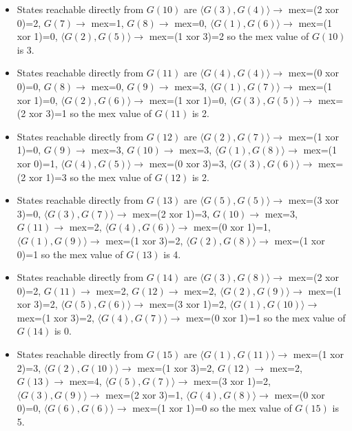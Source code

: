 \begin{solution}
\begin{itemize}
\item States reachable directly from $G(10)$ are $\langle G(3), G(4) \rangle \rightarrow$ mex=(2 xor 0)=2, $G(7) \rightarrow$ mex=1, $G(8) \rightarrow$ mex=0, $\langle G(1), G(6) \rangle \rightarrow$ mex=(1 xor 1)=0, $\langle G(2), G(5) \rangle \rightarrow$ mex=(1 xor 3)=2  so the mex value of $G(10)$ is 3.
\item States reachable directly from $G(11)$ are $\langle G(4), G(4) \rangle \rightarrow$ mex=(0 xor 0)=0, $G(8) \rightarrow$ mex=0, $G(9) \rightarrow$ mex=3, $\langle G(1), G(7) \rangle \rightarrow$ mex=(1 xor 1)=0, $\langle G(2), G(6) \rangle \rightarrow$ mex=(1 xor 1)=0, $\langle G(3), G(5) \rangle \rightarrow$ mex=(2 xor 3)=1  so the mex value of $G(11)$ is 2.
\item States reachable directly from $G(12)$ are $\langle G(2), G(7) \rangle \rightarrow$ mex=(1 xor 1)=0, $G(9) \rightarrow$ mex=3, $G(10) \rightarrow$ mex=3, $\langle G(1), G(8) \rangle \rightarrow$ mex=(1 xor 0)=1, $\langle G(4), G(5) \rangle \rightarrow$ mex=(0 xor 3)=3, $\langle G(3), G(6) \rangle \rightarrow$ mex=(2 xor 1)=3  so the mex value of $G(12)$ is 2.
\item States reachable directly from $G(13)$ are $\langle G(5), G(5) \rangle \rightarrow$ mex=(3 xor 3)=0, $\langle G(3), G(7) \rangle \rightarrow$ mex=(2 xor 1)=3, $G(10) \rightarrow$ mex=3, $G(11) \rightarrow$ mex=2, $\langle G(4), G(6) \rangle \rightarrow$ mex=(0 xor 1)=1, $\langle G(1), G(9) \rangle \rightarrow$ mex=(1 xor 3)=2, $\langle G(2), G(8) \rangle \rightarrow$ mex=(1 xor 0)=1  so the mex value of $G(13)$ is 4.
\item States reachable directly from $G(14)$ are $\langle G(3), G(8) \rangle \rightarrow$ mex=(2 xor 0)=2, $G(11) \rightarrow$ mex=2, $G(12) \rightarrow$ mex=2, $\langle G(2), G(9) \rangle \rightarrow$ mex=(1 xor 3)=2, $\langle G(5), G(6) \rangle \rightarrow$ mex=(3 xor 1)=2, $\langle G(1), G(10) \rangle \rightarrow$ mex=(1 xor 3)=2, $\langle G(4), G(7) \rangle \rightarrow$ mex=(0 xor 1)=1  so the mex value of $G(14)$ is 0.
\item States reachable directly from $G(15)$ are $\langle G(1), G(11) \rangle \rightarrow$ mex=(1 xor 2)=3, $\langle G(2), G(10) \rangle \rightarrow$ mex=(1 xor 3)=2, $G(12) \rightarrow$ mex=2, $G(13) \rightarrow$ mex=4, $\langle G(5), G(7) \rangle \rightarrow$ mex=(3 xor 1)=2, $\langle G(3), G(9) \rangle \rightarrow$ mex=(2 xor 3)=1, $\langle G(4), G(8) \rangle \rightarrow$ mex=(0 xor 0)=0, $\langle G(6), G(6) \rangle \rightarrow$ mex=(1 xor 1)=0  so the mex value of $G(15)$ is 5.

\end{itemize}
\end{solution}
